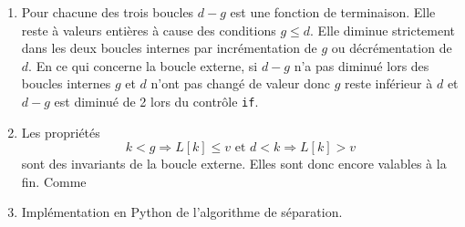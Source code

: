 \begin{enumerate}
  \item Pour chacune des trois boucles $d-g$ est une fonction de terminaison. Elle reste à valeurs entières à cause des conditions $g\leq d$. Elle diminue strictement dans les deux boucles internes par incrémentation de $g$ ou décrémentation de $d$. En ce qui concerne la boucle externe, si $d-g$ n'a pas diminué lors des boucles internes $g$ et $d$ n'ont pas changé de valeur donc $g$ reste inférieur à $d$ et $d-g$ est diminué de 2 lors du contrôle \texttt{if}.
  \item Les propriétés 
\begin{displaymath}
  k < g \Rightarrow L[k] \leq v \text{ et } d < k \Rightarrow L[k] > v
\end{displaymath}
sont des invariants de la boucle externe. Elles sont donc encore valables à la fin. Comme 
  \item Implémentation en Python de l'algorithme de séparation.

\end{enumerate}

